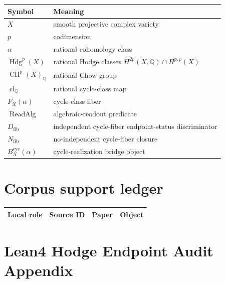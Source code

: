 \documentclass[11pt]{article}
\newcommand{\QQ}{\mathbb{Q}}
\newcommand{\CH}{\operatorname{CH}}
\newcommand{\Hdg}{\operatorname{Hdg}}
\newcommand{\clQ}{\operatorname{cl}_{\QQ}}
\newcommand{\ReadAlg}{\operatorname{ReadAlg}}
\newcommand{\Bridge}{B^{\mathrm{cyc}}_X(\alpha)}
\begin{document}
\begin{longtable}{p{}p{}}
\toprule Symbol & Meaning\\ \midrule\endhead
$X$ & smooth projective complex variety\\
$p$ & codimension\\
$\alpha$ & rational cohomology class\\
$\Hdg^p(X)$ & rational Hodge classes $H^{2p}(X,\QQ)\cap H^{p,p}(X)$\\
$\CH^p(X)_\QQ$ & rational Chow group\\
$\clQ$ & rational cycle-class map\\
$F_X(\alpha)$ & cycle-class fiber\\
$\ReadAlg$ & algebraic-readout predicate\\
$D_{\mathrm{fib}}$ & independent cycle-fiber endpoint-status discriminator\\
$N_{\mathrm{fib}}$ & no-independent cycle-fiber closure\\
$\Bridge$ & cycle-realization bridge object\\
\bottomrule
\end{longtable}

\section{Corpus support ledger}\label{app:corpus-support}


\begin{longtable}{p{}p{}p{}p{}}
\toprule Local role & Source ID & Paper & Object\\ \midrule\endhead

\end{longtable}


\section{Lean4 Hodge Endpoint Audit Appendix}\label{app:lean}
\end{document}
